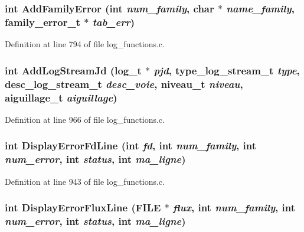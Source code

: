 \subsubsection[{AddFamilyError}]{\setlength{\rightskip}{0pt plus 5cm}int AddFamilyError (int {\em num\_\-family}, \/  char $\ast$ {\em name\_\-family}, \/  family\_\-error\_\-t $\ast$ {\em tab\_\-err})}\label{log__functions_8c_941a9e17b9296690cb5ea89ac8bf5a47}




Definition at line 794 of file log\_\-functions.c.
\subsubsection[{AddLogStreamJd}]{\setlength{\rightskip}{0pt plus 5cm}int AddLogStreamJd (log\_\-t $\ast$ {\em pjd}, \/  type\_\-log\_\-stream\_\-t {\em type}, \/  desc\_\-log\_\-stream\_\-t {\em desc\_\-voie}, \/  niveau\_\-t {\em niveau}, \/  aiguillage\_\-t {\em aiguillage})}\label{log__functions_8c_ef7cd2efc61e27b4fd914075aa8cf7d5}




Definition at line 966 of file log\_\-functions.c.
\subsubsection[{DisplayErrorFdLine}]{\setlength{\rightskip}{0pt plus 5cm}int DisplayErrorFdLine (int {\em fd}, \/  int {\em num\_\-family}, \/  int {\em num\_\-error}, \/  int {\em status}, \/  int {\em ma\_\-ligne})}\label{log__functions_8c_5a8951e81d7b4ab26b9c2aff118ecac0}




Definition at line 943 of file log\_\-functions.c.
\subsubsection[{DisplayErrorFluxLine}]{\setlength{\rightskip}{0pt plus 5cm}int DisplayErrorFluxLine (FILE $\ast$ {\em flux}, \/  int {\em num\_\-family}, \/  int {\em num\_\-error}, \/  int {\em status}, \/  int {\em ma\_\-ligne})}\label{log__functions_8c_be8fb680b54a8c17ac1b641778c19c91}




